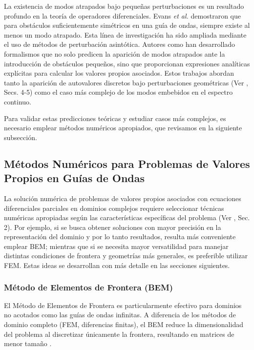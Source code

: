 \documentclass[11pt]{article}
\begin{document}
La existencia de modos atrapados bajo pequeñas perturbaciones es un resultado profundo en la teoría de operadores diferenciales. Evans \emph{et al.} \cite{Evans1994} demostraron que para obstáculos suficientemente simétricos en una guía de ondas, siempre existe al menos un modo atrapado. Esta línea de investigación ha sido ampliada mediante el uso de métodos de perturbación asintótica. Autores como \cite{Zhevandrov2019, Zhevandrov2025} han desarrollado formalismos que no solo predicen la aparición de modos atrapados ante la introducción de obstáculos pequeños, sino que proporcionan expresiones analíticas explícitas para calcular los valores propios asociados. Estos trabajos abordan tanto la aparición de autovalores discretos bajo perturbaciones geométricas (Ver \cite{Zhevandrov2025}, Secs. 4-5) como el caso más complejo de los modos embebidos en el espectro continuo.

Para validar estas predicciones teóricas y estudiar casos más complejos, es necesario emplear métodos numéricos apropiados, que revisamos en la siguiente subsección.

\subsection{Métodos Numéricos para Problemas de Valores Propios en Guías de Ondas}\label{subsec:metodos_numericos}

La solución numérica de problemas de valores propios asociados con ecuaciones diferenciales parciales en dominios complejos requiere seleccionar técnicas numéricas apropiadas según las características específicas del problema (Ver \cite{FahyWalker2004}, Sec. 2). Por ejemplo, si se busca obtener soluciones con mayor precisión en la representación del dominio y por lo tanto resultados, resulta más conveniente emplear BEM; mientras que si se necesita mayor versatilidad para manejar distintas condiciones de frontera y geometrías más generales, es preferible utilizar FEM. Estas ideas se desarrollan con más detalle en las secciones siguientes.

\subsubsection{Método de Elementos de Frontera (BEM)}

El Método de Elementos de Frontera es particularmente efectivo para dominios no acotados como las guías de ondas infinitas. A diferencia de los métodos de dominio completo (FEM, diferencias finitas), el BEM reduce la dimensionalidad del problema al discretizar únicamente la frontera, resultando en matrices de menor tamaño \cite{Pozrikidis2002}.
\end{document}
